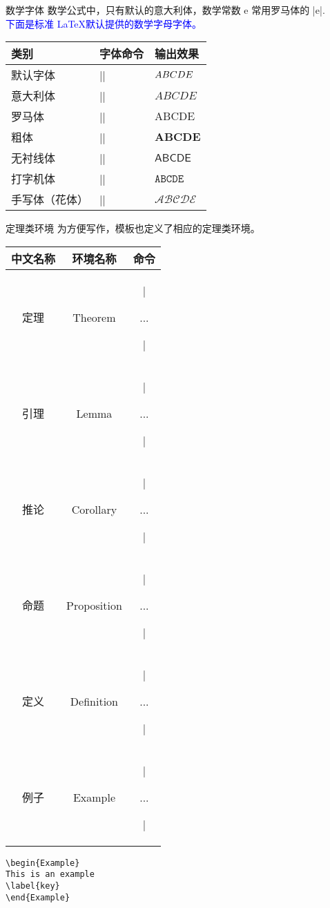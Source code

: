 \begin{frame}[fragile]{数学字体}
\phantom{幻影} 数学公式中，只有默认的意大利体，数学常数 $\mathrm{e}$ 常用罗马体的 |$\mathrm{e}$|.\\
\phantom{幻影幻影幻影} \textcolor{blue}{下面是标准 \LaTeX 默认提供的数学字母字体。}
\begin{table}
\begin{tabular}{lll}
\toprule
类别 		&	字体命令	&	输出效果	\\
\midrule
默认字体	&	|\mathnormal|		&		$\mathnormal{ABCDE}$		\\
意大利体	&	|\mathitl|		&		$\mathit{ABCDE}$		\\	
罗马体	&	|\mathrml|		&		$\mathrm{ABCDE}$		\\	
粗体	&	|\mathbf|		&		$\mathbf{ABCDE}$		\\	
无衬线体	&	|\mathsf|		&		$\mathsf{ABCDE}$		\\	
打字机体	&	|\mathtt|		&		$\mathtt{ABCDE}$		\\	
手写体（花体）		&		|\mathcal|		&		$\mathcal{ABCDE}$		\\
\bottomrule
\end{tabular}
\end{table}

\end{frame}

\begin{frame}[fragile]{定理类环境}
为方便写作，模板也定义了相应的定理类环境。
\begin{table}
\begin{tabular}{ccc}
	\toprule
	中文名称 			&			环境名称			&命令			\\
	\midrule	
	定理			&			Theorem				& |\begin{Theorem} ...\end{Theorem}|		\\
	引理			&			Lemma				& |\begin{Lemma} ...\end{Lemma}|		\\
	推论			&			Corollary			 & |\begin{Corollary} ...\end{Corollary}|	\\
	命题			&			Proposition			&|\begin{Proposition} ...\end{Proposition}|		\\
	定义			&			Definition			&|\begin{Definition} ...\end{Definition}|	\\
	例子			&			Example				&|\begin{Example} ...\end{Example}|	\\
	\bottomrule
\end{tabular}
\end{table}
\begin{lstlisting}
\begin{Example}	
This is an example
\label{key}
\end{Example}
\end{lstlisting}
\end{frame}


